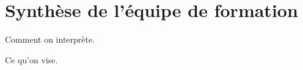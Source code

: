 \documentclass[
  french,
]{article}
\begin{document}
\hypertarget{synthuxe8se-de-luxe9quipe-de-formation}{%
\section{Synthèse de l'équipe de formation}\label{synthuxe8se-de-luxe9quipe-de-formation}}

Comment on interprète.

Ce qu'on vise.
\end{document}

